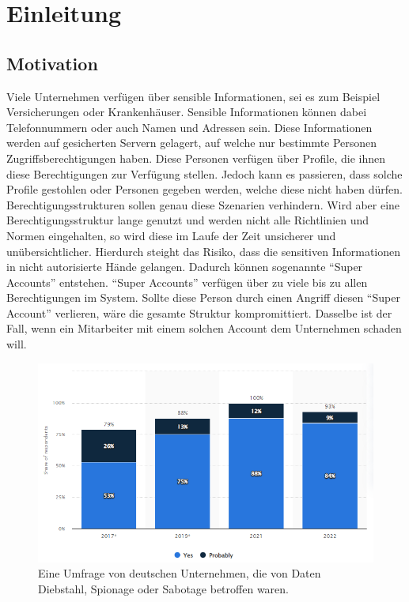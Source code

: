 \chapter{Einleitung}
\label{ch:intro}

\section{Motivation}
\label{sec:intro:motivation}
Viele Unternehmen verfügen über sensible Informationen, sei es zum Beispiel Versicherungen oder Krankenhäuser.
Sensible Informationen können dabei Telefonnummern oder auch Namen und Adressen sein.
Diese Informationen werden auf gesicherten Servern gelagert, auf welche nur bestimmte Personen Zugriffsberechtigungen haben.
Diese Personen verfügen über Profile, die ihnen diese Berechtigungen zur Verfügung stellen.
Jedoch kann es passieren, dass solche Profile gestohlen oder Personen gegeben werden, welche diese nicht haben dürfen.
Berechtigungsstrukturen sollen genau diese Szenarien verhindern.
Wird aber eine Berechtigungsstruktur lange genutzt und werden nicht alle Richtlinien und Normen eingehalten, so wird diese im Laufe der Zeit unsicherer und unübersichtlicher.
Hierdurch steight das Risiko, dass die sensitiven Informationen in nicht autorisierte Hände gelangen.
Dadurch können sogenannte "`Super Accounts"' entstehen.
"`Super Accounts"' verfügen über zu viele bis zu allen Berechtigungen im System.
Sollte diese Person durch einen Angriff diesen "`Super Account"' verlieren, wäre die gesamte Struktur kompromittiert.
Dasselbe ist der Fall, wenn ein Mitarbeiter mit einem solchen Account dem Unternehmen schaden will.

\begin{figure}[h!]
 \centering
 \includegraphics[width=1\textwidth]{gfx/Picture/Cyber_Crime.PNG}
 \caption{Eine Umfrage von deutschen Unternehmen, die von Daten Diebstahl, Spionage oder Sabotage betroffen waren. \cite{Stat22}}
 \label{fig:Crime}
\end{figure}

